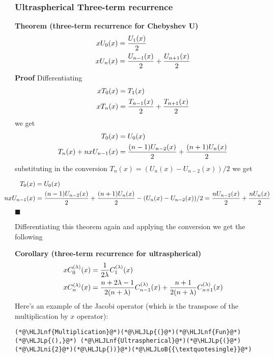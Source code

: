 \documentclass[12pt,landscape]{article}
\newcommand{\HLJLnf}[1]{\textcolor[RGB]{66,102,213}{#1}}
\newcommand{\HLJLni}[1]{\textcolor[RGB]{59,151,46}{#1}}
\newcommand{\HLJLoB}[1]{\textcolor[RGB]{102,102,102}{\textbf{#1}}}
\newcommand{\HLJLp}[1]{#1}
\begin{document}
{\subsubsection{Ultraspherical Three-term recurrence}
\textbf{Theorem (three-term recurrence for Chebyshev U)}
\begin{align*}
x U_0(x) &= {U_1(x) \over 2} \\
x U_n(x) &= {U_{n-1}(x) \over 2} + {U_{n+1}(x) \over 2}
\end{align*}
\textbf{Proof} Differentiating
\begin{align*}
 x T_0(x) &= T_1(x) \\
x T_n(x)  &=  {T_{n-1}(x) \over 2} + {T_{n+1}(x) \over 2}
\end{align*}
we get
\begin{align*}
  T_0(x) &= U_0(x) \\
 T_n(x) + n x U_{n-1}(x)  &=  {(n-1) U_{n-2}(x) \over 2} + {(n+1) U_n(x) \over 2}
\end{align*}
substituting in the conversion $T_n(x) = (U_n(x) - U_{n-2}(x))/2$ we get


\begin{align*}
  T_0(x) &= U_0(x) \\
\hspace*{-0.6 cm} n x U_{n-1}(x)  &=  {(n-1) U_{n-2}(x) \over 2} + {(n+1) U_n(x) \over 2} - (U_n(x) - U_{n-2}(x))/2 = {n U_{n-2}(x) \over 2} + {n U_n(x) \over 2}
\end{align*}
\ensuremath{\blacksquare}

Differentiating this theorem again and applying the conversion we get the following

\textbf{Corollary (three-term recurrence for ultraspherical)}
\begin{align*}
x C_0^{(\lambda)}(x) &= {1 \over 2\lambda } C_1^{(\lambda)}(x) \\
 x C_n^{(\lambda)}(x) &=  {n+2\lambda-1 \over 2(n+\lambda)} C_{n-1}^{(\lambda)}(x) + {n+1 \over 2(n+\lambda)} C_{n+1}^{(\lambda)}(x)
\end{align*}
Here's an example of the Jacobi operator (which is the transpose of the multiplication by $x$ operator):


\begin{lstlisting}
(*@\HLJLnf{Multiplication}@*)(*@\HLJLp{(}@*)(*@\HLJLnf{Fun}@*)(*@\HLJLp{(),}@*) (*@\HLJLnf{Ultraspherical}@*)(*@\HLJLp{(}@*)(*@\HLJLni{2}@*)(*@\HLJLp{))}@*)(*@\HLJLoB{{\textquotesingle}}@*)
\end{lstlisting}

}
\end{document}
